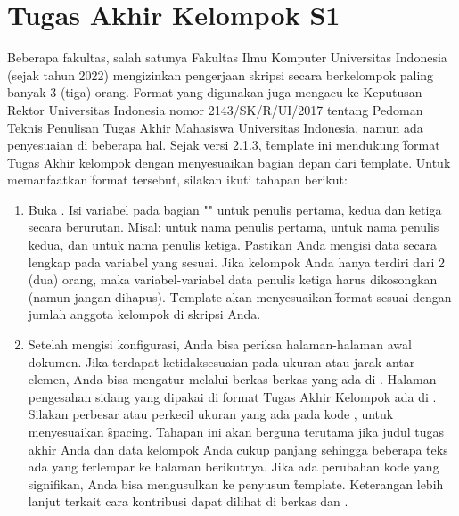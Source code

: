 \section{Tugas Akhir Kelompok S1}
\label{sec:skripsiKelompok}
Beberapa fakultas, salah satunya Fakultas Ilmu Komputer Universitas Indonesia (sejak tahun 2022) mengizinkan pengerjaan skripsi secara berkelompok paling banyak 3 (tiga) orang.
Format yang digunakan juga mengacu ke Keputusan Rektor Universitas Indonesia nomor 2143/SK/R/UI/2017 tentang Pedoman Teknis Penulisan Tugas Akhir Mahasiswa Universitas Indonesia, namun ada penyesuaian di beberapa hal.
Sejak versi 2.1.3, \f{template} ini mendukung \f{format} Tugas Akhir kelompok dengan menyesuaikan bagian depan dari \f{template}.
Untuk memanfaatkan \f{format} tersebut, silakan ikuti tahapan berikut:
\begin{enumerate}
	\item Buka . Isi variabel pada bagian "" untuk penulis pertama, kedua dan ketiga secara berurutan. Misal:  untuk nama penulis pertama,  untuk nama penulis kedua, dan  untuk nama penulis ketiga.
	Pastikan Anda mengisi data secara lengkap pada variabel yang sesuai.
	Jika kelompok Anda hanya terdiri dari 2 (dua) orang, maka variabel-variabel data penulis ketiga harus dikosongkan (namun jangan dihapus).
	\f{Template} akan menyesuaikan \f{format} sesuai dengan jumlah anggota kelompok di skripsi Anda.
	\item Setelah mengisi konfigurasi, Anda bisa periksa halaman-halaman awal dokumen.
	Jika terdapat ketidaksesuaian pada ukuran atau jarak antar elemen, Anda bisa mengatur melalui berkas-berkas yang ada di .
	Halaman pengesahan sidang yang dipakai di format Tugas Akhir Kelompok ada di .
	Silakan perbesar atau perkecil ukuran yang ada pada kode , untuk menyesuaikan \f{spacing}.
	Tahapan ini akan berguna terutama jika judul tugas akhir Anda dan data kelompok Anda cukup panjang sehingga beberapa teks ada yang terlempar ke halaman berikutnya.
	Jika ada perubahan kode yang signifikan, Anda bisa mengusulkan ke penyusun \f{template}.
	Keterangan lebih lanjut terkait cara kontribusi dapat dilihat di berkas  dan .
\end{enumerate}


